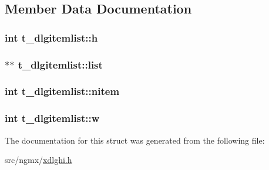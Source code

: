 \subsection{\-Member \-Data \-Documentation}
\hypertarget{structt__dlgitemlist_ac970f848e0cb0b46e8bdf144401838b5}{
\subsubsection[{h}]{\setlength{\rightskip}{0pt plus 5cm}int {\bf t\-\_\-dlgitemlist\-::h}}}\label{structt__dlgitemlist_ac970f848e0cb0b46e8bdf144401838b5}
\hypertarget{structt__dlgitemlist_a9d7f72fd8f45a7720bd49253697bea6c}{
\subsubsection[{list}]{$\ast$$\ast$ {\bf t\-\_\-dlgitemlist\-::list}}}\label{structt__dlgitemlist_a9d7f72fd8f45a7720bd49253697bea6c}
\hypertarget{structt__dlgitemlist_a23e9265445f71021ded9f5df2cc38294}{
\subsubsection[{nitem}]{\setlength{\rightskip}{0pt plus 5cm}int {\bf t\-\_\-dlgitemlist\-::nitem}}}\label{structt__dlgitemlist_a23e9265445f71021ded9f5df2cc38294}
\hypertarget{structt__dlgitemlist_ab911183e3df65e97b452989df1ea5811}{
\subsubsection[{w}]{\setlength{\rightskip}{0pt plus 5cm}int {\bf t\-\_\-dlgitemlist\-::w}}}\label{structt__dlgitemlist_ab911183e3df65e97b452989df1ea5811}


\-The documentation for this struct was generated from the following file\-:\begin{DoxyCompactItemize}
\item 
src/ngmx/\hyperlink{xdlghi_8h}{xdlghi.\-h}\end{DoxyCompactItemize}
